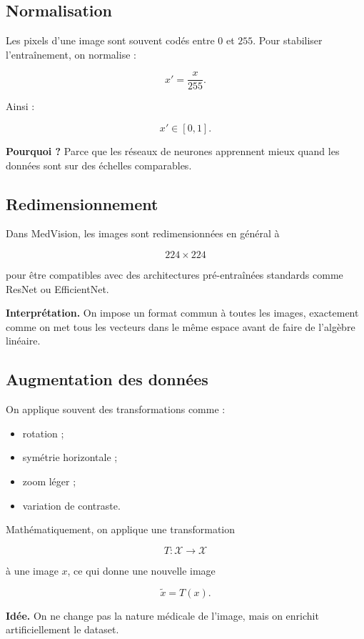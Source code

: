 ﻿\documentclass[11pt,a4paper]{article}
\begin{document}
\subsection{Normalisation}

Les pixels d’une image sont souvent codés entre $0$ et $255$.
Pour stabiliser l’entraînement, on normalise :

\[
x' = \frac{x}{255}.
\]

Ainsi :

\[
x' \in [0,1].
\]

\textbf{Pourquoi ?}  
Parce que les réseaux de neurones apprennent mieux quand les données sont sur des échelles comparables.

\subsection{Redimensionnement}

Dans MedVision, les images sont redimensionnées en général à

\[
224 \times 224
\]

pour être compatibles avec des architectures pré-entraînées standards
comme ResNet ou EfficientNet.

\textbf{Interprétation.}  
On impose un format commun à toutes les images, exactement comme on met tous les vecteurs dans le même espace avant de faire de l’algèbre linéaire.

\subsection{Augmentation des données}

On applique souvent des transformations comme :
\begin{itemize}
    \item rotation ;
    \item symétrie horizontale ;
    \item zoom léger ;
    \item variation de contraste.
\end{itemize}

Mathématiquement, on applique une transformation

\[
T : \mathcal{X} \to \mathcal{X}
\]

à une image $x$, ce qui donne une nouvelle image

\[
\widetilde{x} = T(x).
\]

\textbf{Idée.}  
On ne change pas la nature médicale de l’image, mais on enrichit artificiellement le dataset.
\end{document}
